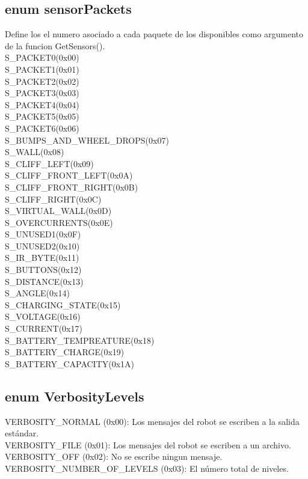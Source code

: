 \documentclass[letterpaper]{book}
\begin{document}
\subsection{enum sensorPackets}
Define los el numero asociado a cada paquete de los disponibles como argumento de la funcion GetSensors().\\
S\_PACKET0(0x00)\\
S\_PACKET1(0x01)\\
S\_PACKET2(0x02)\\
S\_PACKET3(0x03)\\
S\_PACKET4(0x04)\\
S\_PACKET5(0x05)\\
S\_PACKET6(0x06)\\
S\_BUMPS\_AND\_WHEEL\_DROPS(0x07)\\
S\_WALL(0x08)\\
S\_CLIFF\_LEFT(0x09)\\
S\_CLIFF\_FRONT\_LEFT(0x0A)\\
S\_CLIFF\_FRONT\_RIGHT(0x0B)\\
S\_CLIFF\_RIGHT(0x0C)\\
S\_VIRTUAL\_WALL(0x0D)\\
S\_OVERCURRENTS(0x0E)\\
S\_UNUSED1(0x0F)\\
S\_UNUSED2(0x10)\\
S\_IR\_BYTE(0x11)\\
S\_BUTTONS(0x12)\\
S\_DISTANCE(0x13)\\
S\_ANGLE(0x14)\\
S\_CHARGING\_STATE(0x15)\\
S\_VOLTAGE(0x16)\\
S\_CURRENT(0x17)\\
S\_BATTERY\_TEMPREATURE(0x18)\\
S\_BATTERY\_CHARGE(0x19)\\
S\_BATTERY\_CAPACITY(0x1A)

\subsection{ enum VerbosityLevels}
VERBOSITY\_NORMAL (0x00): Los mensajes del robot se escriben a la salida estándar.\\
VERBOSITY\_FILE (0x01): Los mensajes del robot se escriben a un archivo.\\
VERBOSITY\_OFF (0x02): No se escribe ningun mensaje.\\
VERBOSITY\_NUMBER\_OF\_LEVELS (0x03): El número total de niveles.\\
\end{document}
